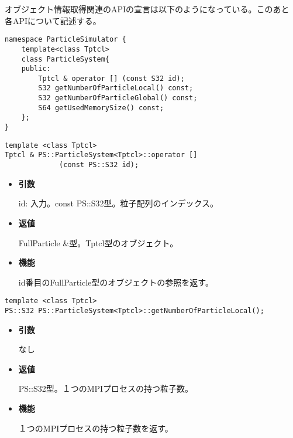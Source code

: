 
オブジェクト情報取得関連のAPIの宣言は以下のようになっている。このあと
各APIについて記述する。

\begin{lstlisting}[caption=ParticleSystem2]
namespace ParticleSimulator {
    template<class Tptcl>
    class ParticleSystem{
    public:
        Tptcl & operator [] (const S32 id);
        S32 getNumberOfParticleLocal() const;
        S32 getNumberOfParticleGlobal() const;
        S64 getUsedMemorySize() const;
    };
}
\end{lstlisting}


\begin{screen}
\begin{verbatim}
template <class Tptcl>
Tptcl & PS::ParticleSystem<Tptcl>::operator []
             (const PS::S32 id);
\end{verbatim}
\end{screen}

\begin{itemize}

\item {\bf 引数}

id: 入力。const PS::S32型。粒子配列のインデックス。

\item {\bf 返値}

FullParticle \&型。Tptcl型のオブジェクト。

\item {\bf 機能}

id番目のFullParticle型のオブジェクトの参照を返す。

\end{itemize}




\begin{screen}
\begin{verbatim}
template <class Tptcl>
PS::S32 PS::ParticleSystem<Tptcl>::getNumberOfParticleLocal();
\end{verbatim}
\end{screen}

\begin{itemize}

\item {\bf 引数}

なし

\item {\bf 返値}

PS::S32型。１つのMPIプロセスの持つ粒子数。

\item {\bf 機能}

１つのMPIプロセスの持つ粒子数を返す。

\end{itemize}

